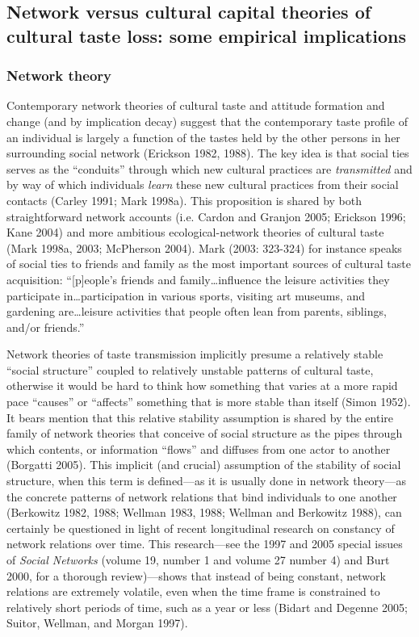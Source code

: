 \documentclass[
]{article}
\begin{document}
\subsection{Network versus cultural capital theories of cultural taste loss: some empirical implications}\label{network-versus-cultural-capital-theories-of-cultural-taste-loss-some-empirical-implications}

\subsubsection{Network theory}\label{network-theory}

Contemporary network theories of cultural taste and attitude formation and change (and by implication decay) suggest that the contemporary taste profile of an individual is largely a function of the tastes held by the other persons in her surrounding social network (Erickson 1982, 1988). The key idea is that social ties serves as the ``conduits'' through which new cultural practices are \emph{transmitted} and by way of which individuals \emph{learn} these new cultural practices from their social contacts (Carley 1991; Mark 1998a). This proposition is shared by both straightforward network accounts (i.e. Cardon and Granjon 2005; Erickson 1996; Kane 2004) and more ambitious ecological-network theories of cultural taste (Mark 1998a, 2003; McPherson 2004). Mark (2003: 323-324) for instance speaks of social ties to friends and family as the most important sources of cultural taste acquisition: ``{[}p{]}eople's friends and family\ldots influence the leisure activities they participate in\ldots participation in various sports, visiting art museums, and gardening are\ldots leisure activities that people often lean from parents, siblings, and/or friends.''

Network theories of taste transmission implicitly presume a relatively stable ``social structure'' coupled to relatively unstable patterns of cultural taste, otherwise it would be hard to think how something that varies at a more rapid pace ``causes'' or ``affects'' something that is more stable than itself (Simon 1952). It bears mention that this relative stability assumption is shared by the entire family of network theories that conceive of social structure as the pipes through which contents, or information ``flows'' and diffuses from one actor to another (Borgatti 2005). This implicit (and crucial) assumption of the stability of social structure, when this term is defined---as it is usually done in network theory---as the concrete patterns of network relations that bind individuals to one another (Berkowitz 1982, 1988; Wellman 1983, 1988; Wellman and Berkowitz 1988), can certainly be questioned in light of recent longitudinal research on constancy of network relations over time. This research---see the 1997 and 2005 special issues of \emph{Social Networks} (volume 19, number 1 and volume 27 number 4) and Burt 2000, for a thorough review)---shows that instead of being constant, network relations are extremely volatile, even when the time frame is constrained to relatively short periods of time, such as a year or less (Bidart and Degenne 2005; Suitor, Wellman, and Morgan 1997).
\end{document}
